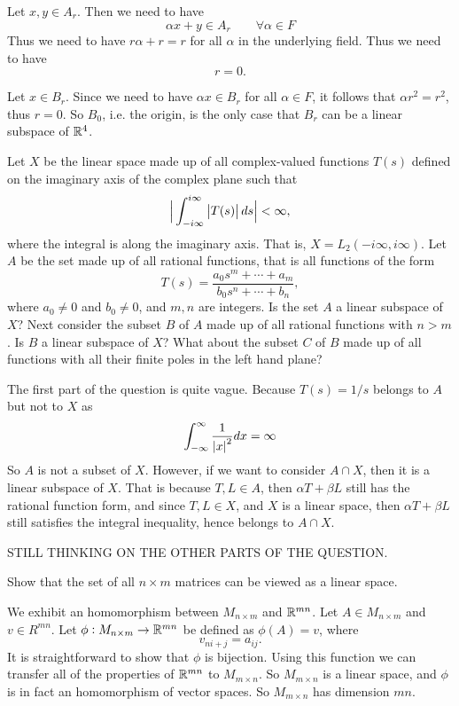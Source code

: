 \begin{solution}
	Let $ x,y \in A_r $. Then we need to have
	\[ \alpha x + y \in A_r \qquad \forall\alpha\in F \]
	Thus we need to have $ r\alpha + r = r $ for all $ \alpha $ in the underlying field. Thus we need to have
	\[ r = 0. \]
	
	Let $ x \in B_r $. Since we need to have $ \alpha x \in B_r $ for all $ \alpha\in F $, it follows that $ \alpha r^2 = r^2 $, thus $ r=0 $. So $ B_0 $, i.e. the origin, is the only case that $ B_r $ can be a linear subspace of $ \mathbb{R}^4 $.
\end{solution}


\begin{problem}
	Let $ X $ be the linear space made up of all complex-valued functions $ T(s) $ defined on the imaginary axis of the complex plane such that
	\[ \big|\int_{-i\infty}^{i\infty} \left|T(s)\right| ds\big|<\infty, \] 
	where the integral is along the imaginary axis. That is, $ X = L_2(-i\infty,i\infty) $. Let $ A $ be the set made up of all rational functions, that is all functions of the form
	\[ T(s) = \frac{a_0s^m + \cdots + a_m}{b_0s^n + \cdots + b_n}, \]
	where $ a_0 \neq0 $ and $ b_0 \neq 0 $, and $ m,n $ are integers. Is the set $ A $ a linear subspace of $ X $? Next consider the subset $ B $ of $ A $ made up of all rational functions with $ n>m$. Is $ B $ a linear subspace of $ X $? What about the subset $ C $ of $ B $ made up of all functions with all their finite poles in the left hand plane?
\end{problem}

\begin{solution}
	The first part of the question is quite vague. Because $ T(s) = 1/s $ belongs to $ A $ but not to $ X $ as
	\[ \int_{-\infty}^{\infty} \frac{1}{\left|x\right|^2} dx = \infty \]
	So $ A $ is not a subset of $ X $. However, if we want to consider $ A\cap X $, then it is a linear subspace of $ X $. That is because $ T, L \in A $, then $ \alpha T + \beta L $ still has the rational function form, and since $ T,L \in X $, and $ X $ is a linear space, then $ \alpha T + \beta L $ still satisfies the integral inequality, hence belongs to $ A\cap X $.
	
	STILL THINKING ON THE OTHER PARTS OF THE QUESTION.
\end{solution}


\begin{problem}
	Show that the set of all $ n\times m $ matrices can be viewed as a linear space.
\end{problem}
\begin{solution}
	We exhibit an homomorphism between $ M_{n\times m} $ and $ \mathbb{R}^{mn} $. Let $ A \in M_{n\times m} $ and $ v \in R^{mn} $. Let $ \phi: M_{n\times m} \to \mathbb{R}^{mn} $ be defined as $ \phi(A) = v $, where
	\[ v_{ni+j} = a_{ij}. \]
	It is straightforward to show that $ \phi $ is bijection. Using this function we can transfer all of the properties of  $ \mathbb{R}^{mn} $ to $ M_{m\times n} $. So $ M_{m\times n} $ is a linear space, and $ \phi $ is in fact an homomorphism of vector spaces. So $ M_{m\times n} $ has dimension $ mn $.
\end{solution}



